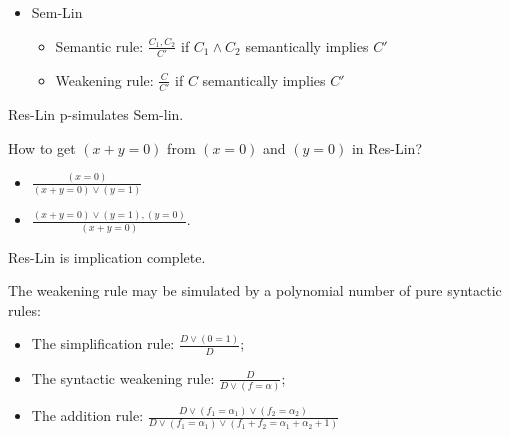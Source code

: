 {
\begin{itemize}
\item Sem-Lin
\begin{itemize}
\item Semantic rule: $\frac{C_1, C_2}{C'}$ if $C_1\land C_2$ semantically implies $C'$
\item Weakening rule: $\frac{C}{C'}$ if $C$ semantically implies $C'$
\end{itemize}
\end{itemize}

\pause\myth Res-Lin p-simulates Sem-lin.

\pause\myex How to get $(x + y = 0)$ from $(x = 0)$ and $(y = 0)$ in Res-Lin? 
\begin{itemize}
\item $\frac{(x = 0)}{(x + y = 0) \lor (y = 1)}$
\item $\frac{(x + y = 0) \lor (y = 1),(y = 0)}{(x + y = 0)}$.
\end{itemize}

\pause
\myth Res-Lin is implication complete.

\begin{itemize}
\pitem The weakening rule may be simulated by a polynomial number of pure syntactic rules: 
\begin{itemize}
\item The simplification rule: $\frac{D\lor (0=1)}{D}$; 
\item The syntactic weakening rule:  $\frac{D}{D\lor (f=\alpha)}$; 
\item The addition rule: $\frac{D\lor (f_1=\alpha_1)\lor (f_2=\alpha_2)}{D\lor (f_1=\alpha_1)\lor (f_1+f_2=\alpha_1+\alpha_2+1)}$
\end{itemize}
\end{itemize}
}

%

